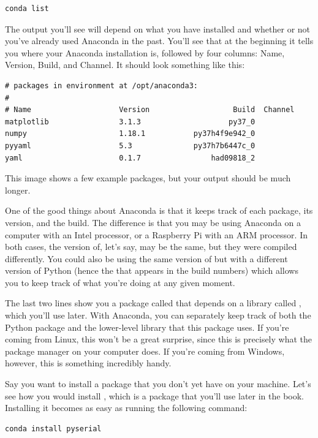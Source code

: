 \begin{verbatim}
conda list
\end{verbatim}

The output you'll see will depend on what you have installed and whether or not you've already used Anaconda in the past. You'll see that at the beginning it tells you where your Anaconda installation is, followed by four columns: Name, Version, Build, and Channel. It should look something like this:

\begin{verbatim}
# packages in environment at /opt/anaconda3:
#
# Name                    Version                   Build  Channel
matplotlib                3.1.3                    py37_0
numpy                     1.18.1           py37h4f9e942_0
pyyaml                    5.3              py37h7b6447c_0
yaml                      0.1.7                had09818_2
\end{verbatim}

This image shows a few example packages, but your output should be much longer.

One of the good things about Anaconda is that it keeps track of each package, its version, and the build. The difference is that you may be using Anaconda on a computer with an Intel processor, or a Raspberry Pi with an ARM processor. In both cases, the version of, let's say,  may be the same, but they were compiled differently. You could also be using the same version of  but with a different version of Python (hence the  that appears in the build numbers) which allows you to keep track of what you're doing at any given moment.

The last two lines show you a package called  that depends on a library called , which you'll use later. With Anaconda, you can separately keep track of both the Python package and the lower-level library that this package uses. If you're coming from Linux, this won't be a great surprise, since this is precisely what the package manager on your computer does. If you're coming from Windows, however, this is something incredibly handy.

Say you want to install a package that you don't yet have on your machine. Let's see how you would install , which is a package that you'll use later in the book. Installing it becomes as easy as running the following command:

\begin{verbatim}
conda install pyserial
\end{verbatim}


